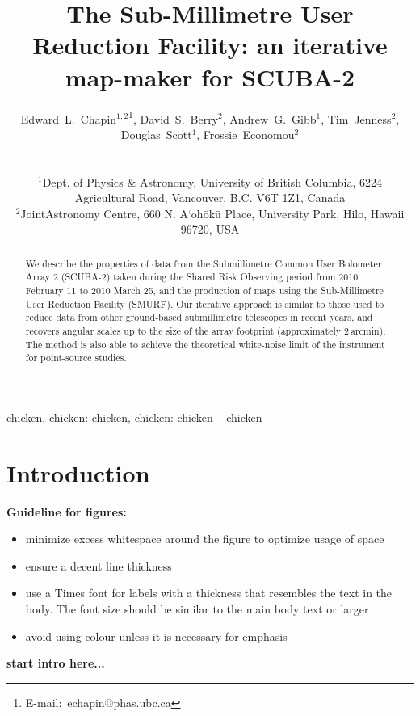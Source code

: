 \documentclass[useAMS,usenatbib,nofootinbib]{mn2e}
\title[SMURF: an iterative map-maker for SCUBA-2]{The Sub-Millimetre User
Reduction Facility: an iterative map-maker for SCUBA-2}
\author[Edward~L.~Chapin~et~al.]{
  \parbox[t]{\textwidth}{
    Edward~L.~Chapin$^{1,2}$\thanks{E-mail:~echapin@phas.ubc.ca},
    David~S.~Berry$^{2}$,
    Andrew~G.~Gibb$^{1}$,
    Tim~Jenness$^{2}$,
    Douglas~Scott$^{1}$,
    Frossie~Economou$^2$
  }
  \\
  \\
  $^{1}$Dept. of Physics \& Astronomy, University of British Columbia,
  6224 Agricultural Road, Vancouver, B.C. V6T 1Z1, Canada\\
  $^{2}$JointAstronomy Centre, 660 N. A`oh\={o}k\={u} Place, University
  Park, Hilo, Hawaii 96720, USA}
\begin{document}
\label{firstpage}

\maketitle

\begin{abstract}
  We describe the properties of data from the Submillimetre Common
  User Bolometer Array 2 (SCUBA-2) taken during the Shared Risk
  Observing period from 2010 February 11 to 2010 March 25, and the
  production of maps using the Sub-Millimetre User Reduction Facility
  (SMURF). Our iterative approach is similar to those used to reduce
  data from other ground-based submillimetre telescopes in recent
  years, and recovers angular scales up to the size of the array
  footprint (approximately 2\,arcmin). The method is also able to
  achieve the theoretical white-noise limit of the instrument for
  point-source studies.
\end{abstract}


\begin{keywords}
chicken, chicken: chicken, chicken: chicken -- chicken
\end{keywords}

\section{Introduction}
\label{sec:intro}

\textbf{Guideline for figures:}

\begin{itemize}
\item minimize excess whitespace around the figure to optimize usage of space
\item ensure a decent line thickness
\item use a Times font for labels with a thickness that resembles the
  text in the body. The font size should be similar to the main body
  text or larger
\item avoid using colour unless it is necessary for emphasis
\end{itemize}

\textbf{start intro here...}
\end{document}
